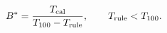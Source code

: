 \begin{equation}
 B^*=\frac{T_{\rm cal}}{T_{100}-T_{\rm rule}},\qquad
 T_{\rm rule}<T_{100}.
 \label{eq:7-payback}
\end{equation}
